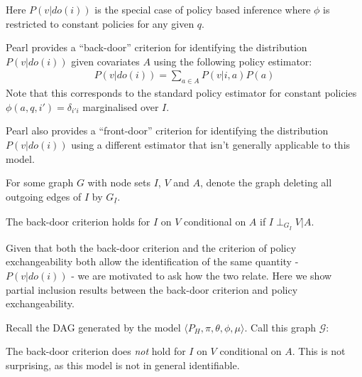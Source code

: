 Here $P(v|do(i))$ is the special case of policy based inference where $\phi$ is restricted to constant policies for any given $q$.

Pearl provides a ``back-door'' criterion for identifying the distribution $P(v|do(i))$ given covariates $A$ using the following policy estimator:
\begin{align}
    P(v|do(i)) = \sum_{a\in A} P(v|i,a) P(a)
\end{align}
Note that this corresponds to the standard policy estimator for constant policies $\phi(a,q,i') = \delta_{i'i}$ marginalised over $I$.

Pearl also provides a ``front-door'' criterion for identifying the distribution $P(v|do(i))$ using a different estimator that isn't generally applicable to this model.

\begin{definition}
For some graph $G$ with node sets $I$, $V$ and $A$, denote the graph deleting all outgoing edges of $I$ by $G_{\underline{I}}$.

The back-door criterion holds for $I$ on $V$ conditional on $A$ if $I\perp_{G_{\underline{I}}} V|A$.
\end{definition}

Given that both the back-door criterion and the criterion of policy exchangeability both allow the identification of the same quantity - $P(v|do(i))$ - we are motivated to ask how the two relate. Here we show partial inclusion results between the back-door criterion and policy exchangeability.

Recall the DAG generated by the model $\langle P_H, \pi,\theta,\phi,\mu\rangle$. Call this graph $\mathcal{G}$:
\begin{center}
\end{center}

The back-door criterion does \emph{not} hold for $I$ on $V$ conditional on $A$. This is not surprising, as this model is not in general identifiable.

